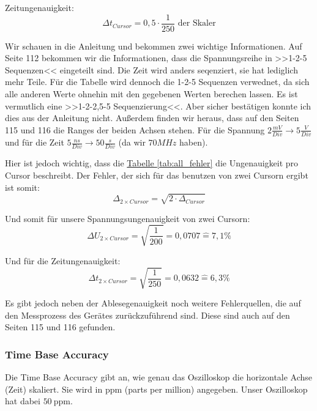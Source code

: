 Zeitungenauigkeit:
\begin{equation}
    \Delta t_{Cursor} = 0,5 \cdot \frac{1}{250} \text{ der Skaler}
\end{equation}

Wir schauen in die Anleitung \cite{CapJ} und bekommen zwei wichtige Informationen. Auf Seite 112 bekommen wir die Informationen, dass die Spannungsreihe in >>1-2-5 Sequenzen<< eingeteilt sind. Die Zeit wird anders seqenziert, sie hat lediglich mehr Teile. Für die Tabelle wird dennoch die 1-2-5 Sequenzen verwednet, da sich alle anderen Werte ohnehin mit den gegebenen Werten berechen lassen. Es ist vermutlich eine >>1-2-2,5-5 Sequenzierung<<. Aber sicher bestätigen konnte ich dies aus der Anleitung nicht.
Außerdem finden wir heraus, dass auf den Seiten 115 und 116 die Ranges der beiden Achsen stehen. 
Für die Spannung $2\frac{mV}{Div} \to 5\frac{V}{Div}$ und für die Zeit $5 \frac{ns}{Div} \to 50 \frac{s}{Div}$ (da wir $70MHz$ haben).

Hier ist jedoch wichtig, dass die \hyperref[tab:all_fehler]{Tabelle \ref*{tab:all_fehler}} die Ungenauigkeit pro Cursor beschreibt. 
Der Fehler, der sich für das benutzen von zwei Cursorn ergibt ist somit:
\begin{equation}
    \Delta_{2\times Cursor} = \sqrt{2 \cdot \Delta_{Cursor}}
\end{equation}

Und somit für unsere Spannungsungenauigkeit von zwei Cursorn:
\begin{equation}
    \Delta U_{2\times Cursor} = \sqrt{\frac{1}{200}} = 0,0707 \hat = 7,1\%
\end{equation}

Und für die Zeitungenauigkeit:
\begin{equation}
    \Delta t_{2\times Cursor} = \sqrt{\frac{1}{250}} = 0,0632 \hat = 6,3\%
\end{equation}

Es gibt jedoch neben der Ablesegenauigkeit noch weitere Fehlerquellen, die auf den Messprozess des Gerätes zurückzuführend sind. Diese sind auch auf den Seiten 115 und 116 gefunden. 

\subsubsection*{Time Base Accuracy}

Die Time Base Accuracy gibt an, wie genau das Oszilloskop die horizontale Achse (Zeit) skaliert. Sie wird in ppm (parts per million) angegeben. Unser Oszilloskop hat dabei \(50~\text{ppm}\).


